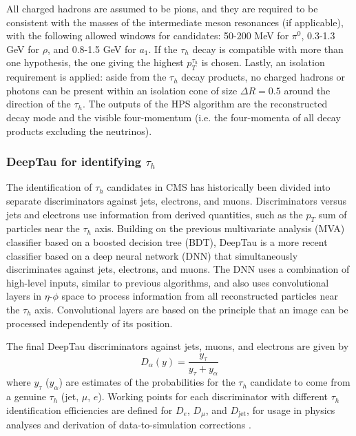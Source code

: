 All charged hadrons are assumed to be pions, and they are required to be consistent with the masses of the intermediate meson resonances (if applicable), with the following allowed windows for candidates: 50-200 MeV for $\pi^0$, 0.3-1.3 GeV for $\rho$, and 0.8-1.5 GeV for $a_1$. If the $\tau_{h}$ decay is compatible with more than one hypothesis, the one giving the highest $p_{T}^{\tau_{h}}$ is chosen. Lastly, an isolation requirement is applied: aside from the $\tau_{h}$ decay products, no charged hadrons or photons can be present within an isolation cone of size $\Delta R = 0.5$ around the direction of the $\tau_{h}$. The outputs of the HPS algorithm are the reconstructed decay mode and the visible four-momentum (i.e. the four-momenta of all decay products excluding the neutrinos).

\subsubsection{DeepTau for identifying \texorpdfstring{$\tau_{h}$}{tauh}}
The identification of $\tau_{h}$ candidates in CMS has historically been divided into separate discriminators against jets, electrons, and muons. Discriminators versus jets and electrons use information from derived quantities, such as the $p_{T}$ sum of particles near the $\tau_{h}$ axis. Building on the previous multivariate analysis (MVA) classifier \cite{CMS-TAU-16-003} based on a boosted decision tree (BDT), DeepTau is a more recent classifier based on a deep neural network (DNN) that simultaneously discriminates against jets, electrons, and muons. The DNN uses a combination of high-level inputs, similar to previous algorithms, and also uses convolutional layers in $\eta$-$\phi$ space to process information from all reconstructed particles near the $\tau_{h}$ axis. Convolutional layers are based on the principle that an image can be processed independently of its position. 

The final DeepTau discriminators against jets, muons, and electrons are given by 
\begin{equation}
    D_\alpha(y) = \frac{y_{\tau}}{y_{\tau} + y_{\alpha}}
\end{equation}
where $y_\tau$ ($y_\alpha$) are estimates of the probabilities for the $\tau_{h}$ candidate to come from a genuine $\tau_{h}$ (jet, $\mu$, $e$). Working points for each discriminator with different $\tau_{h}$ identification efficiencies are defined for $D_{e}$, $D_{\mu}$, and $D_{\text{jet}}$, for usage in physics analyses and derivation of data-to-simulation corrections \cite{2022-PRD-DeepTau}. 

